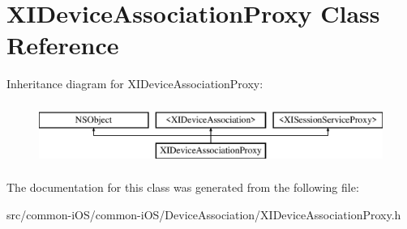 \hypertarget{interface_x_i_device_association_proxy}{}\section{X\+I\+Device\+Association\+Proxy Class Reference}
\label{interface_x_i_device_association_proxy}
Inheritance diagram for X\+I\+Device\+Association\+Proxy\+:\begin{figure}[H]
\begin{center}
\leavevmode
\includegraphics[height=2.000000cm]{interface_x_i_device_association_proxy}
\end{center}
\end{figure}


The documentation for this class was generated from the following file\+:\begin{DoxyCompactItemize}
\item 
src/common-\/i\+O\+S/common-\/i\+O\+S/\+Device\+Association/X\+I\+Device\+Association\+Proxy.\+h\end{DoxyCompactItemize}
